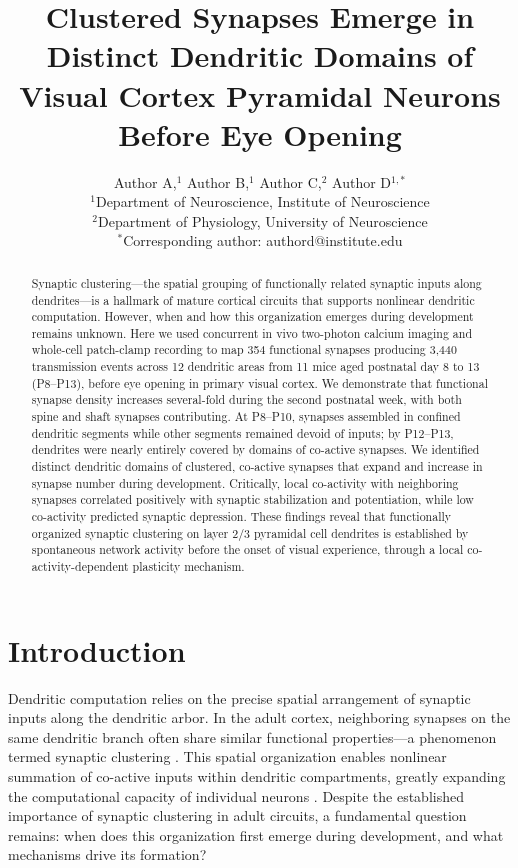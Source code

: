 \documentclass[11pt]{article}
\title{Clustered Synapses Emerge in Distinct Dendritic Domains of Visual Cortex Pyramidal Neurons Before Eye Opening}
\author{Author A,$^{1}$ Author B,$^{1}$ Author C,$^{2}$ Author D$^{1,*}$\\
\small $^{1}$Department of Neuroscience, Institute of Neuroscience\\
\small $^{2}$Department of Physiology, University of Neuroscience\\
\small $^{*}$Corresponding author: authord@institute.edu}
\date{}
\begin{document}
\maketitle

\begin{abstract}
Synaptic clustering---the spatial grouping of functionally related synaptic inputs along dendrites---is a hallmark of mature cortical circuits that supports nonlinear dendritic computation. However, when and how this organization emerges during development remains unknown. Here we used concurrent in vivo two-photon calcium imaging and whole-cell patch-clamp recording to map 354 functional synapses producing 3,440 transmission events across 12 dendritic areas from 11 mice aged postnatal day 8 to 13 (P8--P13), before eye opening in primary visual cortex. We demonstrate that functional synapse density increases several-fold during the second postnatal week, with both spine and shaft synapses contributing. At P8--P10, synapses assembled in confined dendritic segments while other segments remained devoid of inputs; by P12--P13, dendrites were nearly entirely covered by domains of co-active synapses. We identified distinct dendritic domains of clustered, co-active synapses that expand and increase in synapse number during development. Critically, local co-activity with neighboring synapses correlated positively with synaptic stabilization and potentiation, while low co-activity predicted synaptic depression. These findings reveal that functionally organized synaptic clustering on layer 2/3 pyramidal cell dendrites is established by spontaneous network activity before the onset of visual experience, through a local co-activity-dependent plasticity mechanism.
\end{abstract}

\section{Introduction}

Dendritic computation relies on the precise spatial arrangement of synaptic inputs along the dendritic arbor. In the adult cortex, neighboring synapses on the same dendritic branch often share similar functional properties---a phenomenon termed synaptic clustering \citep{chen2011clustered, jia2010dendritic, wilson2016orientation}. This spatial organization enables nonlinear summation of co-active inputs within dendritic compartments, greatly expanding the computational capacity of individual neurons \citep{larkum2009synaptic}. Despite the established importance of synaptic clustering in adult circuits, a fundamental question remains: when does this organization first emerge during development, and what mechanisms drive its formation?
\end{document}
